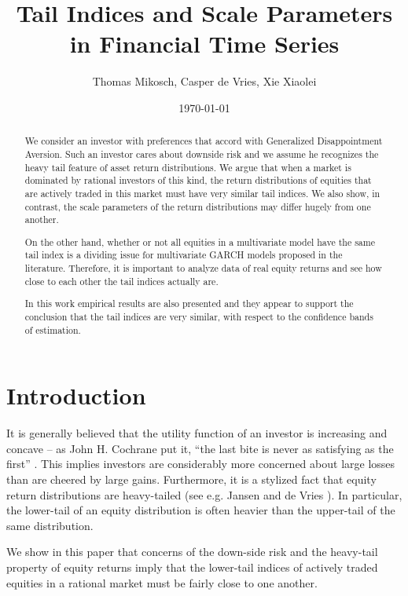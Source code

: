 \documentclass{article}
\title{Tail Indices and Scale Parameters in Financial Time Series}
\author{Thomas Mikosch, Casper de Vries, Xie Xiaolei}
\date{\today}
\newcommand{\1}[1]{
  \mathbf{1}_{\{#1\}}
}
\begin{document}
\maketitle

\begin{abstract}
We consider an investor with preferences that accord with Generalized
Disappointment Aversion. Such an investor cares about downside risk and
we assume he recognizes the heavy tail feature of asset return
distributions. We argue that when a market is dominated by rational
investors of this kind, the return distributions of equities that are
actively traded in this market must have very similar tail indices. We
also show, in contrast, the scale parameters of the return
distributions may differ hugely from one another.

On the other hand, whether or not all equities in a multivariate model
have the same tail index is a dividing issue for multivariate GARCH
models proposed in the literature. Therefore, it is important to analyze
data of real equity returns and see how close to each other the
tail indices actually are.

In this work empirical results are also presented and they appear
to support the conclusion that the tail indices are very similar,
with respect to the confidence bands of estimation.
\end{abstract}

\section{Introduction}
It is generally believed that the utility function of an
investor is increasing and concave -- as John H. Cochrane
put it, ``the last bite is never as satisfying as the first''
\cite{cochrane2009asset}. This implies investors are considerably
more concerned about large losses than are cheered by large gains.
Furthermore, it is a stylized fact that equity return distributions
are heavy-tailed (see e.g. Jansen and de Vries \cite{jansen1991frequency}).
In particular, the lower-tail of an equity distribution is often heavier
than the upper-tail of the same distribution.

We show in this paper that concerns of the down-side risk and the
heavy-tail property of equity returns  imply that the lower-tail indices
of actively traded equities in a rational market must be fairly close to
one another.

\end{document}
